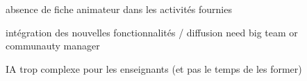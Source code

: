 
absence de fiche animateur dans les activités fournies 


intégration des nouvelles fonctionnalités / diffusion need big team or communauty manager


IA trop complexe pour les enseignants (et pas le temps de les former)

